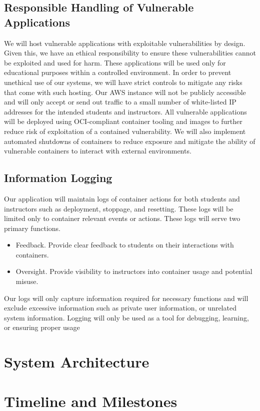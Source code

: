 \documentclass[12pt]{article}
\begin{document}
\subsection{Responsible Handling of Vulnerable Applications}
We will host vulnerable applications with exploitable vulnerabilities by design. Given this, we have an ethical responsibility to ensure these vulnerabilities cannot be exploited and used for harm. These applications will be used only for educational purposes within a controlled environment. In order to prevent unethical use of our systems, we will have strict controls to mitigate any risks that come with such hosting. Our AWS instance will not be publicly accessible and will only accept or send out traffic to a small number of white-listed IP addresses for the intended students and instructors. All vulnerable applications will be deployed using OCI-compliant container tooling and images to further reduce risk of exploitation of a contained vulnerability. We will also implement automated shutdowns of containers to reduce exposure and mitigate the ability of vulnerable containers to interact with external environments.


\subsection{Information Logging}
Our application will maintain logs of container actions for both students and instructors such as deployment, stoppage, and resetting. These logs will be limited only to container relevant events or actions. These logs will serve two primary functions.
\begin{itemize}
	\item Feedback. Provide clear feedback to students on their interactions with containers.
	\item Oversight. Provide visibility to instructors into container usage and potential misuse.
\end{itemize}

Our logs will only capture information required for necessary functions and will exclude excessive information such as private user information, or unrelated system information. Logging will only be used as a tool for debugging, learning, or ensuring proper usage
\section{System Architecture}


\section{Timeline and Milestones}
\end{document}
